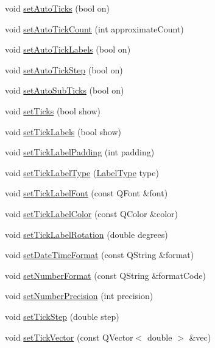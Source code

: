 \begin{DoxyCompactItemize}
\item 
void \hyperlink{classQCPAxis_ae867c23d3a6a7bd4d09cc66c5d018f63}{set\-Auto\-Ticks} (bool on)
\item 
void \hyperlink{classQCPAxis_a7c7111cbeac9ec5fcb40f93a1ef51a0b}{set\-Auto\-Tick\-Count} (int approximate\-Count)
\item 
void \hyperlink{classQCPAxis_aaa47e3a6bac0c20d4beb9028f01bc1a1}{set\-Auto\-Tick\-Labels} (bool on)
\item 
void \hyperlink{classQCPAxis_a99fe77b034e06f5b723995beab96e741}{set\-Auto\-Tick\-Step} (bool on)
\item 
void \hyperlink{classQCPAxis_adcbdec7a60054b88571e89599f4a45bf}{set\-Auto\-Sub\-Ticks} (bool on)
\item 
void \hyperlink{classQCPAxis_ac891409315bc379e3b1abdb162c1a011}{set\-Ticks} (bool show)
\item 
void \hyperlink{classQCPAxis_a04ba16e1f6f78d70f938519576ed32c8}{set\-Tick\-Labels} (bool show)
\item 
void \hyperlink{classQCPAxis_af302c479af9dbc2e9f0e44e07c0012ee}{set\-Tick\-Label\-Padding} (int padding)
\item 
void \hyperlink{classQCPAxis_a54f24f5ce8feea25209388a863d7e448}{set\-Tick\-Label\-Type} (\hyperlink{classQCPAxis_a4a7da0166f755f5abac23b765d184cad}{Label\-Type} type)
\item 
void \hyperlink{classQCPAxis_a2b8690c4e8dbc39d9185d2b398ce7a6c}{set\-Tick\-Label\-Font} (const Q\-Font \&font)
\item 
void \hyperlink{classQCPAxis_a395e445c3fe496b935bee7b911ecfd1c}{set\-Tick\-Label\-Color} (const Q\-Color \&color)
\item 
void \hyperlink{classQCPAxis_a1bddd4413df8a576b7ad4b067fb33375}{set\-Tick\-Label\-Rotation} (double degrees)
\item 
void \hyperlink{classQCPAxis_a2ee0191daa03524a682113e63e05f7a7}{set\-Date\-Time\-Format} (const Q\-String \&format)
\item 
void \hyperlink{classQCPAxis_ae585a54dc2aac662e90a2ca82f002590}{set\-Number\-Format} (const Q\-String \&format\-Code)
\item 
void \hyperlink{classQCPAxis_a21dc8023ad7500382ad9574b48137e63}{set\-Number\-Precision} (int precision)
\item 
void \hyperlink{classQCPAxis_af727db0acc6492c4c774c0700e738205}{set\-Tick\-Step} (double step)
\item 
void \hyperlink{classQCPAxis_a871db94c5d796c80fcbe1a9d4506e27e}{set\-Tick\-Vector} (const Q\-Vector$<$ double $>$ \&vec)

\end{DoxyCompactItemize}
